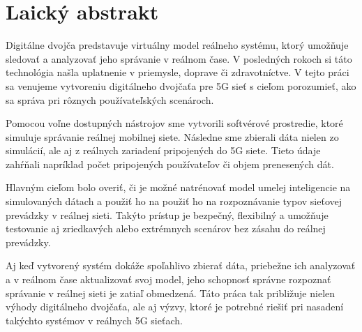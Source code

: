 \chapter{Laický abstrakt}
Digitálne dvojča predstavuje virtuálny model reálneho systému, ktorý umožňuje sledovať a analyzovať jeho správanie v reálnom čase. V posledných rokoch si táto technológia našla uplatnenie v priemysle, doprave či zdravotníctve. V tejto práci sa venujeme vytvoreniu digitálneho dvojčaťa pre 5G sieť s cieľom porozumieť, ako sa správa pri rôznych používateľských scenároch.

Pomocou voľne dostupných nástrojov sme vytvorili softvérové prostredie, ktoré simuluje správanie reálnej mobilnej siete. Následne sme zbierali dáta nielen zo simulácií, ale aj z reálnych zariadení pripojených do 5G siete. Tieto údaje zahŕňali napríklad počet pripojených používateľov či objem prenesených dát.

Hlavným cieľom bolo overiť, či je možné natrénovať model umelej inteligencie na simulovaných dátach a použiť ho na použiť ho na rozpoznávanie typov sieťovej prevádzky v reálnej sieti. Takýto prístup je bezpečný, flexibilný a umožňuje testovanie aj zriedkavých alebo extrémnych scenárov bez zásahu do reálnej prevádzky.

Aj keď vytvorený systém dokáže spoľahlivo zbierať dáta, priebežne ich analyzovať a v reálnom čase aktualizovať svoj model, jeho schopnosť správne rozpoznať správanie v reálnej sieti je zatiaľ obmedzená. Táto práca tak približuje nielen výhody digitálneho dvojčaťa, ale aj výzvy, ktoré je potrebné riešiť pri nasadení takýchto systémov v reálnych 5G sieťach.
